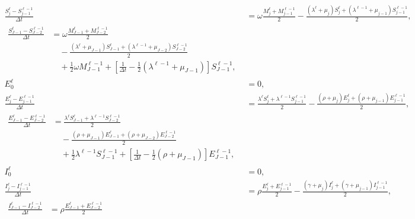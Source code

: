 \documentclass{jpmarticle}
\let\subequationsorig\subequations%
\let\endsubequationsorig\endsubequations%
\renewenvironment{subequations}{
  \subequationsorig
  \renewcommand{\theequation}{\theparentequation.\arabic{equation}}
}{
  \endsubequationsorig
}
\begin{document}
\begin{subequations}
\begin{align}
    \\
    \frac{S_j^{\ell} - S_{j - 1}^{\ell - 1}}{\Delta t} &=
    \omega \frac{M_j^{\ell} + M_{j - 1}^{\ell - 1}}{2}
    - \frac{(\lambda^{\ell} + \mu_j) S_j^{\ell}
      + (\lambda^{\ell - 1} + \mu_{j - 1}) S_{j - 1}^{\ell - 1}}{2},
    \\
    \begin{split}
      \frac{S_{J - 1}^{\ell} - S_{J - 2}^{\ell - 1}}{\Delta t} &=
      \omega \frac{M_{J - 1}^{\ell} + M_{J - 2}^{\ell - 1}}{2}
      \\ & \quad {}
      - \frac{(\lambda^{\ell} + \mu_{J - 1}) S_{J - 1}^{\ell}
        + (\lambda^{\ell - 1} + \mu_{J - 2}) S_{J - 2}^{\ell - 1}}
      {2}
      \\ & \quad {}
      + \frac{1}{2} \omega M_{J - 1}^{\ell - 1}
      + \left[\frac{1}{\Delta t}
        - \frac{1}{2} (\lambda^{\ell - 1} + \mu_{J - 1})\right]
      S_{J - 1}^{\ell - 1},
    \end{split}
    \\
    E_0^{\ell} &= 0,
    \\
    \frac{E_j^{\ell} - E_{j - 1}^{\ell - 1}}{\Delta t} &=
    \frac{\lambda^{\ell} S_j^{\ell} + \lambda^{\ell - 1} S_{j - 1}^{\ell - 1}}{2}
    - \frac{(\rho + \mu_j) E_j^{\ell}
      + (\rho + \mu_{j - 1}) E_{j - 1}^{\ell - 1}}{2},
    \\
    \begin{split}
      \frac{E_{J - 1}^{\ell} - E_{J - 2}^{\ell - 1}}{\Delta t} &=
      \frac{\lambda^{\ell} S_{J - 1}^{\ell}
        + \lambda^{\ell - 1} S_{J - 2}^{\ell - 1}}{2}
      \\ & \quad {}
      - \frac{(\rho + \mu_{J - 1}) E_{J - 1}^{\ell}
        + (\rho + \mu_{J - 2}) E_{J - 2}^{\ell - 1}}{2}
      \\ & \quad {}
      + \frac{1}{2} \lambda^{\ell - 1} S_{J - 1}^{\ell - 1}
      + \left[\frac{1}{\Delta t}
        - \frac{1}{2} (\rho + \mu_{J - 1})\right]
      E_{J - 1}^{\ell - 1},
    \end{split}
    \\
    I_0^{\ell} &= 0,
    \\
    \frac{I_j^{\ell} - I_{j - 1}^{\ell - 1}}{\Delta t} &=
    \rho \frac{E_j^{\ell} + E_{j - 1}^{\ell - 1}}{2}
    - \frac{(\gamma + \mu_j) I_j^{\ell}
      + (\gamma + \mu_{j - 1}) I_{j - 1}^{\ell - 1}}{2},
    \\
    \begin{split}
      \frac{I_{J - 1}^{\ell} - I_{J - 2}^{\ell - 1}}{\Delta t} &=
      \rho \frac{E_{J - 1}^{\ell} + E_{J - 2}^{\ell - 1}}{2}

\end{split}
\end{align}
\end{subequations}
\end{document}
